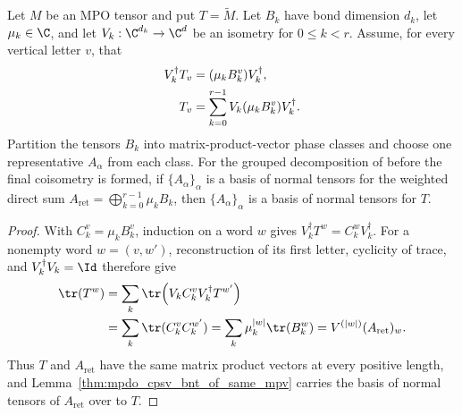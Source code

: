 \begin{lemma}
    \label{thm:mpdo_vertical_grouped_is_bnt}
    \leanok
    Let $M$ be an MPO tensor and put $T=\widetilde M$. Let $B_k$ have bond
    dimension $d_k$, let $\mu_k\in\C$, and let
    $V_k:\C^{d_k}\to\C^d$ be an isometry for $0\leq k<r$. Assume, for every
    vertical letter $v$, that
    \begin{align}
        V_k^\dagger T_v & =(\mu_kB_k^v)V_k^\dagger,
        \notag                                                         \\
        T_v             & =\sum_{k=0}^{r-1}V_k(\mu_kB_k^v)V_k^\dagger.
        \notag
    \end{align}
    Partition the tensors $B_k$ into matrix-product-vector phase classes and
    choose one representative $A_\alpha$ from each class. For the grouped
    decomposition of \cite[Proposition~4.13, lines~1863--1921]{Cirac2016MPDO_arXiv}
    before the final coisometry is formed, if $\{A_\alpha\}_\alpha$ is a basis
    of normal tensors for the weighted direct sum
    $A_{\mathrm{ret}}=\bigoplus_{k=0}^{r-1}\mu_kB_k$, then
    $\{A_\alpha\}_\alpha$ is a basis of normal tensors for $T$.
\end{lemma}

\begin{proof}
    \leanok
    With $C_k^v=\mu_kB_k^v$, induction on a word $w$ gives
    $V_k^\dagger T^w=C_k^wV_k^\dagger$.
    For a nonempty word $w=(v,w')$, reconstruction of its first letter,
    cyclicity of trace, and $V_k^\dagger V_k=\Id$ therefore give
    \begin{align}
        \tr(T^w)
         & =\sum_k\tr\!\left(V_kC_k^vV_k^\dagger T^{w'}\right)
        \notag                                                 \\
         & =\sum_k\tr(C_k^vC_k^{w'})
        =\sum_k\mu_k^{|w|}\tr(B_k^w)
        =V^{(|w|)}(A_{\mathrm{ret}})_w.
        \notag
    \end{align}
    Thus $T$ and $A_{\mathrm{ret}}$ have the same matrix product vectors at
    every positive length, and Lemma~\ref{thm:mpdo_cpsv_bnt_of_same_mpv}
    carries the basis of normal tensors of $A_{\mathrm{ret}}$ over to $T$.
\end{proof}

